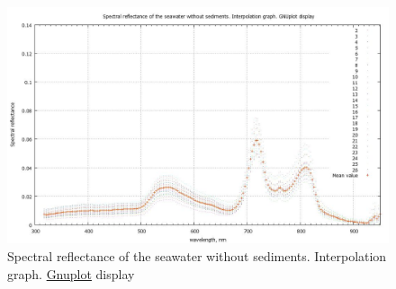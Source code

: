 \documentclass[11pt]{article}
\begin{document}
\begin{appendices}
\begin{figure}[H]
	\begin{center}
		\includegraphics[scale=0.22]{GNU-10.jpg}
		\caption{Spectral reflectance of the seawater without sediments. Interpolation graph. \href{http://www.gnuplot.info/}{Gnuplot} display­}
		\label{fig:A.24}
	\end{center}
\end{figure}


\end{appendices}
\end{document}
